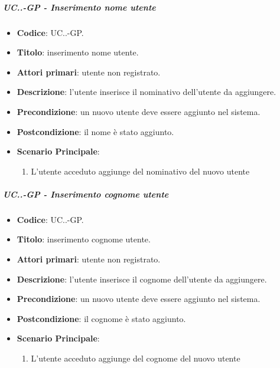 		\subparagraph{UC\theuccount.\thesubuccount.\thesubsubuccount-GP - Inserimento nome utente}
			
			\begin{itemize}
				\item \textbf{Codice}: UC\theuccount.\thesubuccount.\thesubsubuccount-GP.
				\item \textbf{Titolo}: inserimento nome utente.
				\item \textbf{Attori primari}: utente non registrato.
				\item \textbf{Descrizione}: l'utente inserisce il nominativo dell'utente da aggiungere.
				\item \textbf{Precondizione}: un nuovo utente deve essere aggiunto nel sistema.
				\item \textbf{Postcondizione}: il nome è stato aggiunto.
				\item \textbf{Scenario Principale}:
				\begin{enumerate}
					\item L'utente acceduto aggiunge del nominativo del nuovo utente
				\end{enumerate}
			\end{itemize}
		
		\subparagraph{UC\theuccount.\thesubuccount.\thesubsubuccount-GP - Inserimento cognome utente}
			
			\begin{itemize}
				\item \textbf{Codice}: UC\theuccount.\thesubuccount.\thesubsubuccount-GP.
				\item \textbf{Titolo}: inserimento cognome utente.
				\item \textbf{Attori primari}: utente non registrato.
				\item \textbf{Descrizione}: l'utente inserisce il cognome dell'utente da aggiungere.
				\item \textbf{Precondizione}: un nuovo utente deve essere aggiunto nel sistema.
				\item \textbf{Postcondizione}: il cognome è stato aggiunto.
				\item \textbf{Scenario Principale}:
				\begin{enumerate}
					\item L'utente acceduto aggiunge del cognome del nuovo utente
				\end{enumerate}
			\end{itemize}
		
